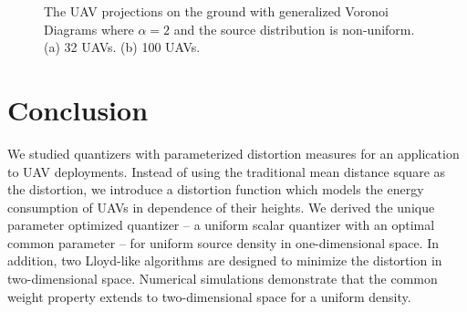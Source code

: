 \documentclass[12pt,onecolumn,journal,draftclsnofoot,letterpaper]{IEEEtran}
\begin{document}
\begin{figure}[t]
\centering
{}
\hfil
{}
\captionsetup{justification=justified}
\vspace{-2ex}
\caption{\small{The UAV projections on the ground with generalized Voronoi Diagrams where $\alpha=2$ and the source distribution is non-uniform. 
(a) 32 UAVs. (b) 100 UAVs.}}
\label{uniformDistortionPartition3}
\end{figure}
\else   \fi \section{Conclusion}
%
We studied quantizers with parameterized distortion measures for an application to UAV deployments.  Instead of using the
traditional mean distance square as the distortion, we introduce a distortion function which models the energy
consumption of UAVs in dependence of their heights.  We derived the unique parameter optimized quantizer -- a uniform
scalar quantizer with an optimal common parameter -- for uniform source density in one-dimensional space.  In addition, two
Lloyd-like algorithms are designed to minimize the distortion in two-dimensional space.  Numerical simulations
demonstrate that the common weight property extends to two-dimensional space for a uniform density.
\end{document}
